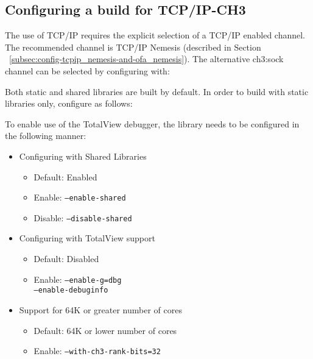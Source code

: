 \subsection{Configuring a build for TCP/IP-CH3}
\label{subsec:config-tcpip_ch3}

The use of TCP/IP requires the explicit selection of a TCP/IP enabled channel.
The recommended channel is TCP/IP Nemesis (described in Section
~\ref{subsec:config-tcpip_nemesis-and-ofa_nemesis}).  The alternative
ch3:sock channel can be selected by configuring with:


Both static and shared libraries are built by default. In order to build with static libraries only, configure as follows:


To enable use of the TotalView debugger, the library needs to be configured
in the following manner:


\begin{itemize}
	\item Configuring with Shared Libraries
		\begin{itemize}
			\item Default: Enabled
			\item Enable: \texttt{--enable-shared}
            \item Disable: \texttt{--disable-shared}
		\end{itemize}

	\item Configuring with TotalView support
		\begin{itemize}
			\item Default: Disabled
			\item Enable: \texttt{--enable-g=dbg \\
                                   --enable-debuginfo}
		\end{itemize}
	\item Support for 64K or greater number of cores
		\begin{itemize}
			\item Default: 64K or lower number of cores
			\item Enable: \texttt{--with-ch3-rank-bits=32}
		\end{itemize}
\end{itemize}

